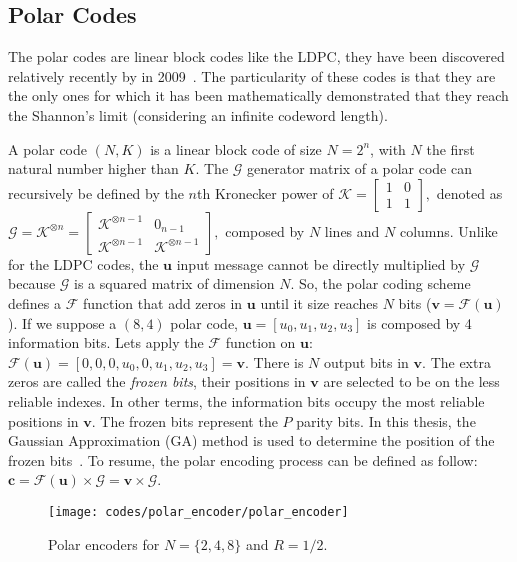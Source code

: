 \subsection{Polar Codes}

The polar codes are linear block codes like the LDPC, they have been discovered
relatively recently by \Arikan in 2009~\cite{Arikan2009}. The particularity of
these codes is that they are the only ones for which it has been mathematically
demonstrated that they reach the Shannon's limit (considering an infinite
codeword length).

A polar code $(N,K)$ is a linear block code of size $N = 2^n$, with $N$ the
first natural number higher than $K$. The $\bm{\mathcal{G}}$ generator matrix of
a polar code can recursively be defined by the $n$th Kronecker power of
$\bm{\mathcal{K}} =
\begin{bmatrix}
1 & 0 \\
1 & 1
\end{bmatrix},$
denoted as
$
\bm{\mathcal{G}} = \bm{\mathcal{K}}^{\otimes n} =
\begin{bmatrix}
\bm{\mathcal{K}}^{\otimes n-1} & 0_{n -1} \\
\bm{\mathcal{K}}^{\otimes n-1} & \bm{\mathcal{K}}^{\otimes n-1}
\end{bmatrix},
$
composed by $N$ lines and $N$ columns. Unlike for the LDPC codes, the $\bm{u}$
input message cannot be directly multiplied by $\bm{\mathcal{G}}$ because
$\bm{\mathcal{G}}$ is a squared matrix of dimension $N$. So, the polar coding
scheme defines a $\mathcal{F}$ function that add zeros in $\bm{u}$ until it size
reaches $N$ bits ($\bm{v} = \mathcal{F}(\bm{u})$). If we suppose a $(8,4)$ polar
code, $\bm{u} = [u_0, u_1, u_2, u_3]$ is composed by 4 information bits. Lets
apply the $\mathcal{F}$ function on $\bm{u}$: $\mathcal{F}(\bm{u}) =
[0, 0, 0, u_0, 0, u_1, u_2, u_3] = \bm{v}$. There is $N$ output bits in
$\bm{v}$. The extra zeros are called the \emph{frozen bits}, their positions in
$\bm{v}$ are selected to be on the less reliable indexes. In other terms, the
information bits occupy the most reliable positions in $\bm{v}$. The frozen bits
represent the $P$ parity bits. In this thesis, the Gaussian Approximation (GA)
method is used to determine the position of the frozen bits~\cite{Trifonov2012}.
To resume, the polar encoding process can be defined as follow: $\bm{c} =
\mathcal{F}(\bm{u}) \times \bm{\mathcal{G}} = \bm{v} \times \bm{\mathcal{G}}$.

\begin{figure}[htp]
  \centering
  \texttt{[image: codes/polar\_encoder/polar\_encoder]}
  \caption{Polar encoders for $N = \{2, 4, 8\}$ and $R = 1/2$.}
  \label{fig:ctx_codes_polar_encoder}
\end{figure}

